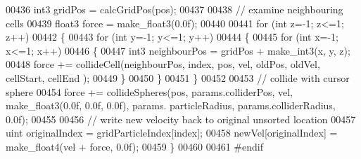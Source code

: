 \begin{DoxyCode}
00436     int3 gridPos = calcGridPos(pos);
00437 
00438     \textcolor{comment}{// examine neighbouring cells}
00439     float3 force = make\_float3(0.0f);
00440 
00441     \textcolor{keywordflow}{for} (\textcolor{keywordtype}{int} z=-1; z<=1; z++)
00442     \{
00443         \textcolor{keywordflow}{for} (\textcolor{keywordtype}{int} y=-1; y<=1; y++)
00444         \{
00445             \textcolor{keywordflow}{for} (\textcolor{keywordtype}{int} x=-1; x<=1; x++)
00446             \{
00447                 int3 neighbourPos = gridPos + make\_int3(x, y, z);
00448                 force += collideCell(neighbourPos, index, pos, vel, oldPos, oldVel, cellStart, cellEnd
      );
00449             \}
00450         \}
00451     \}
00452 
00453     \textcolor{comment}{// collide with cursor sphere}
00454     force += collideSpheres(pos, params.colliderPos, vel, make\_float3(0.0f, 0.0f, 0.0f), params.
      particleRadius, params.colliderRadius, 0.0f);
00455 
00456     \textcolor{comment}{// write new velocity back to original unsorted location}
00457     uint originalIndex = gridParticleIndex[index];
00458     newVel[originalIndex] = make\_float4(vel + force, 0.0f);
00459 \}
00460 
00461 \textcolor{preprocessor}{#}\textcolor{preprocessor}{endif}
\end{DoxyCode}
